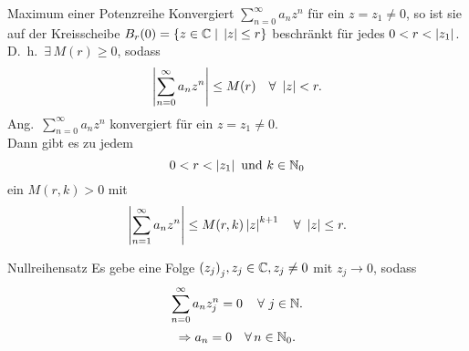 \documentclass[main.tex]{subfiles}
\begin{document}
\begin{karte}{Maximum einer Potenzreihe}
    Konvergiert \( \sum_{n=0}^\infty a_n z^n \) 
    für ein \( z = z_1 \neq 0 \), so ist sie auf 
    der Kreisscheibe \( B_r (0)  
    = \{ z\in\mathbb{C} \;\vert \; \left| z \right|\leq r \} \)
    beschränkt für jedes \( 0 < r < \left| z_1 \right| \).\\
    D.\ h.\  \( \exists \, M(r) \geq 0 \), sodass
    \[ \abs{ \sum_{n=0}^\infty a_n z^n } \leq M(r) 
    \quad \forall \, \abs{z} < r. \]
    Ang.\  \( \sum_{n=0}^\infty a_n z^n \) konvergiert 
    für ein \( z = z_1 \neq 0 \). \\
    Dann gibt es zu jedem
    \[ 0 < r < \left| z_1 \right| \text{ und } k\in\mathbb{N}_0\]
    ein \( M(r,k) > 0 \) mit
    \[ \abs{ \sum_{n=1}^\infty a_n z^n } 
    \leq M(r,k) \abs{z}^{k+1} \quad \forall \, \abs{z}\leq r. \]
\end{karte}
\begin{karte}{Nullreihensatz}
    Es gebe eine Folge \( {(z_j)}_j, z_j \in\mathbb{C}, z_j 
    \neq 0 \) mit \( z_j \rightarrow 0 \), sodass 
    \[ \sum_{n=0}^\infty a_n z_j^n = 0 \quad \,\forall \, j\in\N. \]
    \[ \Rightarrow a_n = 0 \quad \forall n\in\N_0. \]
\end{karte}
\end{document}
